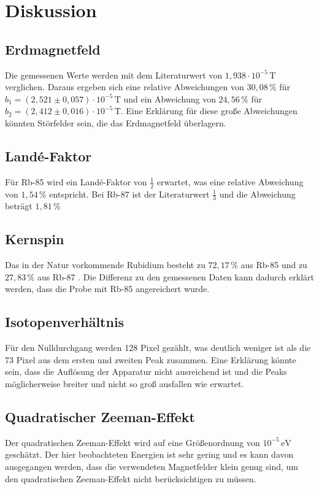 \section{Diskussion}
\label{sec:Diskussion}

\subsection{Erdmagnetfeld}
\label{sec:Diskussion}

Die gemessenen Werte werden mit dem Literaturwert von $1,938 \cdot 10^{-5} \, \unit{\tesla}$\cite{Pfeiler+2017} verglichen.
Daraus ergeben sich eine relative Abweichungen von $30,08 \, \%$ für $b_1 = \left( 2,521 \pm 0,057 \right) \cdot 10^{-5}\, \unit{\tesla}$ und ein 
Abweichung von $24,56 \, \% $ für $b_2 = \left( 2,412  \pm 0,016 \right) \cdot 10^{-5}\, \unit{\tesla}$.
Eine Erklärung für diese große Abweichungen könnten Störfelder sein, die das Erdmagnetfeld überlagern.\\


\subsection{Landé-Faktor}


Für Rb-85 wird ein Landé-Faktor von $\frac{1}{2} $ erwartet, was eine relative Abweichung von $1,54 \, \%$ entspricht.
Bei Rb-87 ist der Literaturwert $\frac{1}{3}$ und die Abweichung beträgt $1,81 \, \%$\\


\subsection{Kernspin}


Das in der Natur vorkommende Rubidium besteht zu $72,17 \, \%$ aus Rb-85 und zu $27,83 \, \%$ aus Rb-87\cite{Pfeiler+2017} .
Die Differenz zu den gemessenen Daten kann dadurch erklärt werden, dass die Probe mit Rb-85 angereichert wurde.\\


\subsection{Isotopenverhältnis}

Für den Nulldurchgang werden 128 Pixel gezählt, was deutlich weniger ist als die 73 Pixel aus dem ersten und zweiten Peak zusammen.
Eine Erklärung könnte sein, dass die Auflösung der Apparatur nicht ausreichend ist und die Peaks möglicherweise breiter und nicht so groß ausfallen wie erwartet.\\


\subsection{Quadratischer Zeeman-Effekt}

Der quadratischen Zeeman-Effekt wird auf eine Größenordnung von $10^{-5} \, \unit{\electronvolt}$ geschätzt.
Der hier beobachteten Energien ist sehr gering und es kann davon ausgegangen werden, dass
die verwendeten Magnetfelder klein genug sind, um den quadratischen Zeeman-Effekt nicht berücksichtigen zu müssen. 